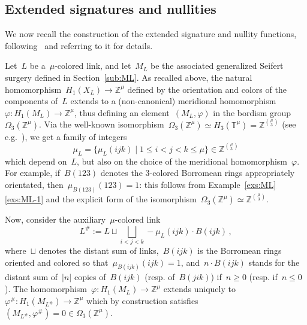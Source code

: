 \documentclass{amsart}
\newcommand{\Z}{\mathbb{Z}}
\theoremstyle{definition}
\theoremstyle{remark}
\begin{document}
	
	\subsection{Extended signatures  and nullities}
	\label{sub:ext}
	
	
	
We now recall the construction of the extended signature and nullity functions, following~\cite{CMP23}
and referring to it for details.

Let~$L$ be a~$\mu$-colored link, and let~$M_L$ be the associated generalized Seifert surgery defined in Section~\ref{sub:ML}. As recalled above, the natural homomorphism~$H_1(X_L)\to\Z^\mu$ defined by the orientation and colors of the components of~$L$ extends to a (non-canonical) meridional homomorphism~$\varphi\colon H_1(M_L)\to\Z^\mu$, thus defining an element~$(M_L,\varphi)$ in the bordism group~$\Omega_3(\Z^\mu)$. Via
the well-known isomorphism~$\Omega_3(\Z^\mu)\simeq H_3(\mathbb{T}^\mu)=\Z^{\mu\choose 3}$
(see e.g.~\cite[Section~3]{DNOP}), we get a family of integers
\[
\mu_L=\{\mu_L(ijk)\mid 1\le i<j<k\le \mu\}\in\Z^{\mu\choose 3}
\]
which depend on~$L$, but also on the choice of the meridional homomorphism~$\varphi$. For example, if~$B(123)$
denotes the $3$-colored Borromean rings appropriately orientated, then~$\mu_{B(123)}(123)=1$: this follows
from Example~\ref{exs:ML}\ref{exs:ML-1} and the explicit form of the isomorphism~$\Omega_3(\Z^\mu)\simeq\Z^{\mu\choose 3}$.

Now, consider the auxiliary~$\mu$-colored link
\begin{equation}
\label{eq:Lsharp}
L^\#:= L\sqcup \bigsqcup_{i<j<k} -\mu_L(ijk)\cdot B(ijk)\,,
\end{equation}
where~$\sqcup$ denotes the distant sum of links,~$B(ijk)$ is the Borromean rings oriented and colored so that~$\mu_{B(ijk)}(ijk)=1$, and~$n\cdot B(ijk)$ stands for the distant sum of~$\vert n\vert$ copies of~$B(ijk)$ (resp. of~$B(jik)$) if~$n\ge 0$ (resp. if~$n\le 0$). The homomorphism~$\varphi\colon H_1(M_L)\to\Z^\mu$ extends uniquely to~$\varphi^\#\colon H_1(M_{L^\#})\to\Z^\mu$ which by construction satisfies~$(M_{L^\#},\varphi^\#)=0\in\Omega_3(\Z^\mu)$.
\end{document}
